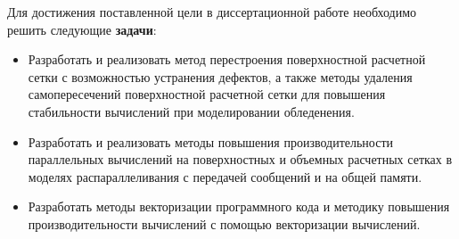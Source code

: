 Для достижения поставленной цели в диссертационной работе необходимо решить следующие \textbf{задачи}:
\begin{itemize}[noitemsep,topsep=0pt,parsep=0pt,partopsep=0pt]
\item Разработать и реализовать метод перестроения поверхностной расчетной сетки с возможностью устранения дефектов, а также методы удаления самопересечений поверхностной расчетной сетки для повышения стабильности вычислений при моделировании обледенения.
\item Разработать и реализовать методы повышения производительности параллельных вычислений на поверхностных и объемных расчетных сетках в моделях распараллеливания с передачей сообщений и на общей памяти.
\item Разработать методы векторизации программного кода и методику повышения производительности вычислений с помощью векторизации вычислений.
\end{itemize}